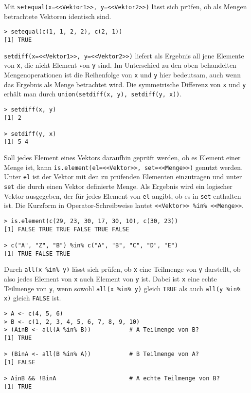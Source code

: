 Mit \lstinline!setequal(x=<<Vektor1>>, y=<<Vektor2>>)! lässt sich prüfen, ob als Mengen betrachtete Vektoren identisch sind.
\begin{lstlisting}
> setequal(c(1, 1, 2, 2), c(2, 1))
[1] TRUE
\end{lstlisting}

\lstinline!setdiff(x=<<Vektor1>>, y=<<Vektor2>>)! liefert als Ergebnis all jene Elemente von \lstinline!x!, die nicht Element von \lstinline!y! sind. Im Unterschied zu den oben behandelten Mengenoperationen ist die Reihenfolge von \lstinline!x! und \lstinline!y! hier bedeutsam, auch wenn das Ergebnis als Menge betrachtet wird. Die symmetrische Differenz von \lstinline!x! und \lstinline!y! erhält man durch \lstinline!union(setdiff(x, y), setdiff(y, x))!.
\begin{lstlisting}
> setdiff(x, y)
[1] 2

> setdiff(y, x)
[1] 5 4
\end{lstlisting}

Soll jedes Element eines Vektors daraufhin geprüft werden, ob es Element einer Menge ist, kann \lstinline!is.element(el=<<Vektor>>, set=<<Menge>>)! genutzt werden. Unter \lstinline!el! ist der Vektor mit den zu prüfenden Elementen einzutragen und unter \lstinline!set! die durch einen Vektor definierte Menge. Als Ergebnis wird ein logischer Vektor ausgegeben, der für jedes Element von \lstinline!el! angibt, ob es in \lstinline!set! enthalten ist. Die Kurzform in Operator-Schreibweise lautet \lstinline!<<Vektor>> %in% <<Menge>>!.
\begin{lstlisting}
> is.element(c(29, 23, 30, 17, 30, 10), c(30, 23))
[1] FALSE TRUE TRUE FALSE TRUE FALSE

> c("A", "Z", "B") %in% c("A", "B", "C", "D", "E")
[1] TRUE FALSE TRUE
\end{lstlisting}

Durch \lstinline!all(x %in% y)! lässt sich prüfen, ob \lstinline!x! eine Teilmenge von \lstinline!y! darstellt, ob also jedes Element von \lstinline!x! auch Element von \lstinline!y! ist. Dabei ist \lstinline!x! eine echte Teilmenge von \lstinline!y!, wenn sowohl \lstinline!all(x %in% y)! gleich \lstinline!TRUE! als auch \lstinline!all(y %in% x)! gleich \lstinline!FALSE! ist.
\begin{lstlisting}
> A <- c(4, 5, 6)
> B <- c(1, 2, 3, 4, 5, 6, 7, 8, 9, 10)
> (AinB <- all(A %in% B))           # A Teilmenge von B?
[1] TRUE

> (BinA <- all(B %in% A))           # B Teilmenge von A?
[1] FALSE

> AinB && !BinA                     # A echte Teilmenge von B?
[1] TRUE
\end{lstlisting}

